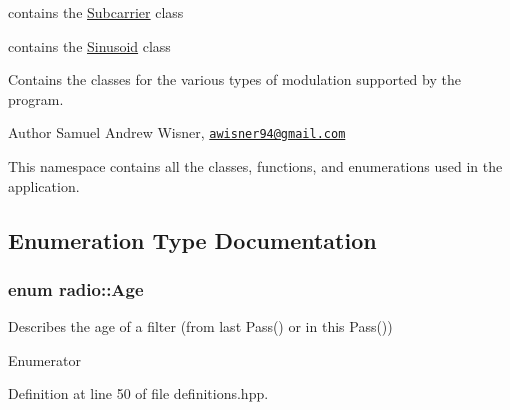 contains the \hyperlink{classradio_1_1Subcarrier}{Subcarrier} class

contains the \hyperlink{classradio_1_1Sinusoid}{Sinusoid} class

Contains the classes for the various types of modulation supported by the program.

\begin{DoxyAuthor}{Author}
Samuel Andrew Wisner, \href{mailto:awisner94@gmail.com}{\tt awisner94@gmail.\+com}
\end{DoxyAuthor}
This namespace contains all the classes, functions, and enumerations used in the application. 

\subsection{Enumeration Type Documentation}
\hypertarget{namespaceradio_a90839d95c13fa21f45e9cd380e38f1f3}{
\subsubsection[{Age}]{\setlength{\rightskip}{0pt plus 5cm}enum {\bf radio\+::\+Age}}}\label{namespaceradio_a90839d95c13fa21f45e9cd380e38f1f3}
Describes the age of a filter (from last Pass() or in this Pass()) \begin{Desc}
\item[Enumerator]\par
\begin{description}
\item[{\em 
\hypertarget{namespaceradio_a90839d95c13fa21f45e9cd380e38f1f3afbe8ecd067dc1095175b7cdc7cecbb82}{O\+L\+D}\label{namespaceradio_a90839d95c13fa21f45e9cd380e38f1f3afbe8ecd067dc1095175b7cdc7cecbb82}
}]\item[{\em 
\hypertarget{namespaceradio_a90839d95c13fa21f45e9cd380e38f1f3ac1a7d3b0b6d1c9639e94bdd8c8692686}{N\+E\+W}\label{namespaceradio_a90839d95c13fa21f45e9cd380e38f1f3ac1a7d3b0b6d1c9639e94bdd8c8692686}
}]\end{description}
\end{Desc}


Definition at line 50 of file definitions.\+hpp.


